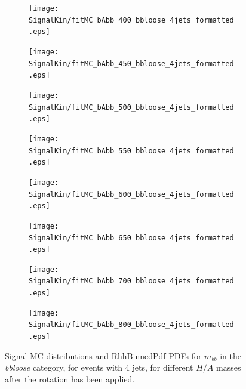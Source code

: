 \begin{figure}[phtb!]
  \begin{center}
  \begin{subfigure}[$m_{A}=400$ GeV]{0.4\textwidth}\texttt{[image: SignalKin/fitMC\_bAbb\_400\_bbloose\_4jets\_formatted.eps]}\end{subfigure}
  \begin{subfigure}[$m_{A}=450$ GeV]{0.4\textwidth}\texttt{[image: SignalKin/fitMC\_bAbb\_450\_bbloose\_4jets\_formatted.eps]}\end{subfigure}
  \begin{subfigure}[$m_{A}=500$ GeV]{0.4\textwidth}\texttt{[image: SignalKin/fitMC\_bAbb\_500\_bbloose\_4jets\_formatted.eps]}\end{subfigure}
  \begin{subfigure}[$m_{A}=550$ GeV]{0.4\textwidth}\texttt{[image: SignalKin/fitMC\_bAbb\_550\_bbloose\_4jets\_formatted.eps]}\end{subfigure}
  \begin{subfigure}[$m_{A}=600$ GeV]{0.4\textwidth}\texttt{[image: SignalKin/fitMC\_bAbb\_600\_bbloose\_4jets\_formatted.eps]}\end{subfigure}
  \begin{subfigure}[$m_{A}=650$ GeV]{0.4\textwidth}\texttt{[image: SignalKin/fitMC\_bAbb\_650\_bbloose\_4jets\_formatted.eps]}\end{subfigure}
  \begin{subfigure}[$m_{A}=700$ GeV]{0.4\textwidth}\texttt{[image: SignalKin/fitMC\_bAbb\_700\_bbloose\_4jets\_formatted.eps]}\end{subfigure}
  \begin{subfigure}[$m_{A}=800$ GeV]{0.4\textwidth}\texttt{[image: SignalKin/fitMC\_bAbb\_800\_bbloose\_4jets\_formatted.eps]}\end{subfigure}
  \caption{Signal MC distributions and RhhBinnedPdf PDFs for $m_{bb}$ in the {\it bbloose} category, for events with 4 jets, for different $H/A$ masses after the rotation has been applied.\label{fig:signalPDFs_4j_bbloose}} 
    \end{center}
\end{figure}


